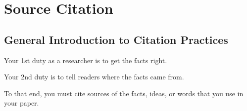 \documentclass[oneside]{book}
\numberwithin{equation}{section}
\begin{document}

\part{Source Citation}


\chapter{General Introduction to Citation Practices}

Your 1st duty as a researcher is to get the facts right.

Your 2nd duty is to tell readers where the facts came from.

To that end, you must cite sources of the facts, ideas, or words that you use in your paper.
\end{document}
